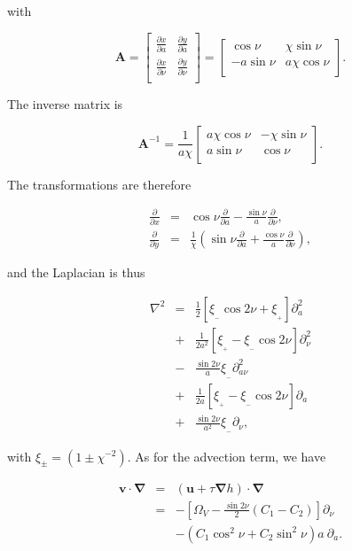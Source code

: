 \documentclass[apj]{emulateapj}
\newcommand{\pderiv}[2]{\frac{\partial #1}{\partial #2}}
\newcommand{\vt}[1]{\mathbf{#1}}       %
\renewcommand{\v}[1]{{\boldsymbol{#1}}} %
\newcommand{\del}{\v{\nabla}}
\newcommand{\grad}{\del}
\newcommand{\Laplace}{\nabla^2}
\newcommand{\beq}{\begin{equation}}
\newcommand{\eeq}{\end{equation}}
\newcommand{\beqn}{\begin{eqnarray}}
\newcommand{\eeqn}{\end{eqnarray}}
\newcommand{\epsp}{\xi_{_{+}}}
\newcommand{\epsm}{\xi_{_{-}}}
\begin{document}
\noindent with 

\beq
\vt{A} = \left[\begin{array}{cc}
\pderiv{x}{a}  & \pderiv{y}{a}  \\
\pderiv{x}{\nu}  & \pderiv{y}{\nu} \\
\end{array}\right] = \left[\begin{array}{cc}
\cos\nu  & \chi\sin\nu  \\
-a\sin\nu  & a\chi\cos\nu \\
\end{array}\right]. 
\eeq

\noindent The inverse matrix is 

\beq
\vt{A}^{-1} = \frac{1}{a\chi} \left[\begin{array}{cc}
a\chi\cos\nu  & -\chi\sin\nu  \\
a\sin\nu  & \cos\nu \\
\end{array}\right].  
\eeq

The transformations are therefore

\beqn
\pderiv{}{x} &=& \cos\nu \pderiv{}{a} - \frac{\sin\nu}{a} \pderiv{}{\nu}, \\
\pderiv{}{y} &=& \frac{1}{\chi}\left(\sin\nu \pderiv{}{a} + \frac{\cos\nu}{a} \pderiv{}{\nu} \right),
\eeqn

\noindent and the Laplacian is thus 

\beqn
\Laplace{} &= &\frac{1}{2}\left[ \epsm \cos 2\nu +  \epsp\right] \partial^2_a  \nonumber \\
                &+& \frac{1}{2a^2}\left[ \epsp - \epsm \cos 2\nu\right] \partial^2_\nu \nonumber \\
                &-& \frac{\sin 2\nu}{a}\epsm \partial^2_{a\nu}   \nonumber \\
                &+& \frac{1}{2a}\left[ \epsp - \epsm \cos 2\nu\right] \partial_a \nonumber \\
                &+& \frac{\sin 2\nu}{a^2} \epsm\partial_\nu, \label{eq:laplace}
\eeqn

\noindent with $\xi_{\pm} = (1 \pm \chi^{-2})$.  As for the advection term, we have 

\beqn
\v{v}\cdot\del &=& (\v{u} + \tau \grad h) \cdot \del \nonumber \\
&=& - \left[\varOmega_V - \frac{\sin2\nu}{2}  (C_1 -  C_2)\right]\partial_\nu \nonumber \\
&&- \left( C_1 \cos^2\nu   + C_2\sin^2\nu \right) a \ \partial_a. \label{eq:advection-term}
\eeqn
\end{document}
